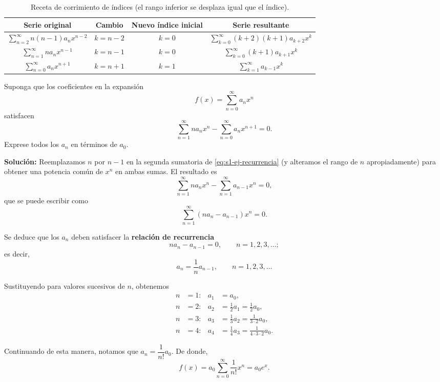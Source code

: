 \begin{table}[H]
\centering
\small
\caption{Receta de corrimiento de índices (el rango inferior se desplaza igual que el índice).}
\label{tab:s1-corrimiento}
\begin{tabular}{|c|c|c|c|}
\hline
\rowcolor{bbe!15}\textbf{Serie original} & \textbf{Cambio} & \textbf{Nuevo índice inicial} & \textbf{Serie resultante} \\ \hline
$\displaystyle\sum_{n=2}^{\infty} n(n-1)a_n x^{n-2}$ & $k=n-2$ & $k=0$ & $\displaystyle\sum_{k=0}^{\infty}(k+2)(k+1)a_{k+2}x^{k}$ \\ \hline
$\displaystyle\sum_{n=1}^{\infty} n a_n x^{n-1}$ & $k=n-1$ & $k=0$ & $\displaystyle\sum_{k=0}^{\infty}(k+1)a_{k+1}x^{k}$ \\ \hline
$\displaystyle\sum_{n=0}^{\infty} a_n x^{n+1}$ & $k=n+1$ & $k=1$ & $\displaystyle\sum_{k=1}^{\infty}a_{k-1}x^{k}$ \\ \hline
\end{tabular}
\end{table}
 
\begin{example}
    Suponga que los coeficientes en la expansión
\[ f(x) = \sum_{n=0}^{\infty} a_n x^n \]
satisfacen
\begin{equation}
\sum_{n=1}^{\infty} n a_n x^n - \sum_{n=0}^{\infty} a_n x^{n+1} = 0.
\label{eq:s1-ej-recurrencia}
\end{equation}
Exprese todos los $a_n$ en términos de $a_0$.
 
\noindent \textbf{Solución:} \quad Reemplazamos $n$ por $n - 1$ en la segunda sumatoria de \eqref{eq:s1-ej-recurrencia} (y alteramos el rango de $n$ apropiadamente) para obtener una potencia común de $x^n$ en ambas sumas. El resultado es
\[ \sum_{n=1}^{\infty} n a_n x^n - \sum_{n=1}^{\infty} a_{n-1} x^n = 0, \]
que se puede escribir como
\[ \sum_{n=1}^{\infty} (n a_n - a_{n-1}) x^n = 0. \]
 
Se deduce que los $a_n$ deben satisfacer la \textbf{relación de recurrencia}
\[ n a_n - a_{n-1} = 0, \qquad n = 1, 2, 3, \dots; \]
es decir,
\[ a_n = \frac{1}{n} a_{n-1}, \qquad n = 1, 2, 3, \dots \]
 
Sustituyendo para valores sucesivos de $n$, obtenemos
\begin{align*}
n &= 1: & a_1 &= a_0, \\
n &= 2: & a_2 &= \frac{1}{2} a_1 = \frac{1}{2} a_0, \\
n &= 3: & a_3 &= \frac{1}{3} a_2 = \frac{1}{3 \cdot 2} a_0, \\
n &= 4: & a_4 &= \frac{1}{4} a_3 = \frac{1}{4 \cdot 3 \cdot 2} a_0.
\end{align*}
 
Continuando de esta manera, notamos que $a_n = \dfrac{1}{n!} a_0$. De donde,
\[ f(x) = a_0 \sum_{n=0}^{\infty} \frac{1}{n!} x^n = a_0 e^x. \tag*{$\square$} \]
\end{example}
 
